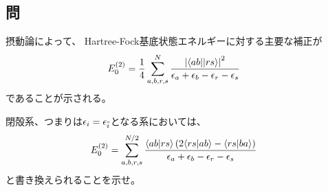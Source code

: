 \subsection{問}
摂動論によって、
Hartree-Fock基底状態エネルギーに対する主要な補正が
\begin{align}
	E_0^{(2)}
&=
	\frac{1}{4}
	\sum_{a,b,r,s}^{N}
		\frac{
			\left|
				{\braket{ab||rs}}
			\right|^2
		}{
			\epsilon_a
			+
			\epsilon_b
			-
			\epsilon_r
			-
			\epsilon_s
		}
\end{align}
であることが示される。

閉殻系、つまりは$\epsilon_{{i}}=\epsilon_{{\overline{i}}}$となる系においては、
\begin{align}
	E_0^{(2)}
&=
	\sum_{a,b,r,s}^{N/2}
		\frac{
			{\braket{ab|rs}}
			\left(
				2{\braket{rs|ab}}
				-
				{\braket{rs|ba}}
			\right)
		}{
			\epsilon_a
			+
			\epsilon_b
			-
			\epsilon_r
			-
			\epsilon_s
		}
\end{align}
と書き換えられることを示せ。


